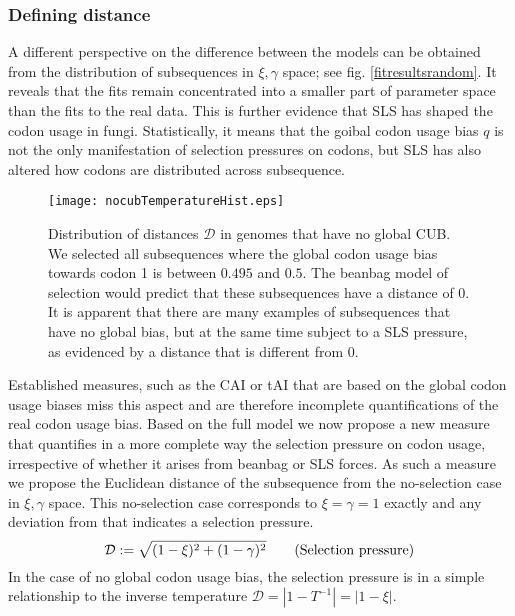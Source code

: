 \documentclass[a4paper,10pt]{paper}%
\begin{document}
\subsubsection{Defining distance}
A  different perspective on the difference between the models can be obtained from the distribution of subsequences  in $\xi, \gamma$ space; see fig. \ref{fitresultsrandom}.  It  reveals  that  the fits remain concentrated into a smaller part of parameter space than the fits to the real data.  This is further evidence  that SLS has shaped the codon usage in fungi.  Statistically, it means that the goibal codon usage bias $q$ is not the only manifestation of selection pressures on codons, but  SLS has also altered how codons are distributed across subsequence.  
%
%
\begin{figure}
\centering
\texttt{[image: nocubTemperatureHist.eps]}
\caption{Distribution of distances $\mathcal D$  in genomes that have no global CUB. We selected all subsequences where the global codon usage bias  towards codon 1 is  between $0.495$ and $0.5$. The beanbag model of selection would predict that these subsequences have a distance of 0. It is apparent that there are many examples of subsequences that have no global bias, but at the same time subject to a SLS pressure, as evidenced by a distance that is different from 0.}
\label{nocubtemperaturehist}
\end{figure}
%
%
\par
Established measures, such as the CAI \cite{cai} or tAI \cite{tai} that are based on the global codon usage biases miss this aspect and are therefore incomplete quantifications of the real codon usage bias.  Based on the full model we  now propose a new measure that quantifies in a more complete way the selection pressure on codon usage, irrespective of whether it arises from beanbag or SLS forces. As such a measure we propose  the Euclidean distance  of the subsequence from the no-selection case in  $\xi, \gamma$ space.  This no-selection case corresponds to  $\xi=\gamma=1$ exactly and  any deviation from that indicates a selection pressure.
%
% 
\begin{equation}
\mathcal D:= \sqrt{(1-\xi)^2 + (1-\gamma)^2} \tag{\textrm{Selection pressure}}
\end{equation}
%
%  
In the case  of no global codon usage bias, the selection pressure  is in a simple relationship to the inverse temperature $\mathcal D = | 1- T^{-1}|= | 1- \xi|$.
\par
\end{document}
